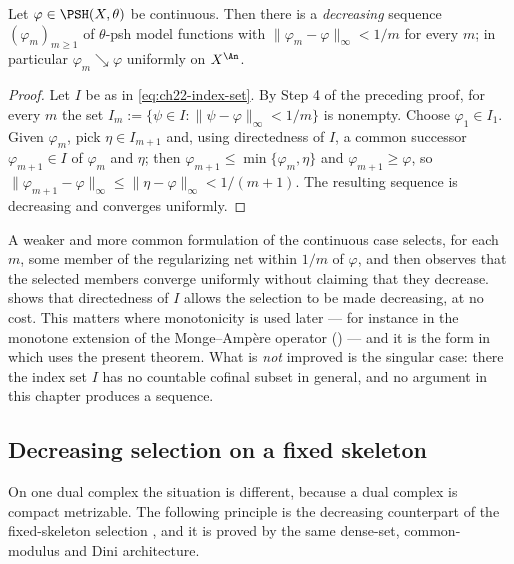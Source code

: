 \begin{corollary}
\label{cor:ch22-continuous-decreasing-sequence}
Let \(\varphi\in\PSH(X,\theta)\) be continuous.  Then there is a
\emph{decreasing} sequence \((\varphi_m)_{m\geq1}\) of \(\theta\)-psh model
functions with
\(\|\varphi_m-\varphi\|_{\infty}<1/m\) for every \(m\); in particular
\(\varphi_m\searrow\varphi\) uniformly on \(X^{\An}\).
\end{corollary}

\begin{proof}
Let \(I\) be as in \eqref{eq:ch22-index-set}.  By Step 4 of the preceding
proof, for every \(m\) the set
\(I_m:=\{\psi\in I:\|\psi-\varphi\|_\infty<1/m\}\) is nonempty.  Choose
\(\varphi_1\in I_1\).  Given \(\varphi_{m}\), pick \(\eta\in I_{m+1}\) and,
using directedness of \(I\), a common successor
\(\varphi_{m+1}\in I\) of \(\varphi_m\) and \(\eta\); then
\(\varphi_{m+1}\leq\min\{\varphi_m,\eta\}\) and
\(\varphi_{m+1}\geq\varphi\), so
\(\|\varphi_{m+1}-\varphi\|_\infty\leq\|\eta-\varphi\|_\infty<1/(m+1)\).
The resulting sequence is decreasing and converges uniformly.
\end{proof}

\begin{remark}
\label{rem:ch22-decreasing-selection-improvement}
A weaker and more common formulation of the continuous case selects, for
each \(m\), some member of the regularizing net within \(1/m\) of
\(\varphi\), and then observes that the selected members converge uniformly
without claiming that they decrease.  
shows that directedness of \(I\) allows the selection to be made decreasing,
at no cost.  This matters where monotonicity is used later --- for instance
in the monotone extension of the Monge--Amp\`ere operator
() --- and it is the form in which
 uses the present theorem.  What is
\emph{not} improved is the singular case: there the index set \(I\) has no
countable cofinal subset in general, and no argument in this chapter
produces a sequence.
\end{remark}

\subsection{Decreasing selection on a fixed skeleton}

On one dual complex the situation is different, because a dual complex is
compact metrizable.  The following principle is the decreasing counterpart
of the fixed-skeleton selection ,
and it is proved by the same dense-set, common-modulus and Dini
architecture.

